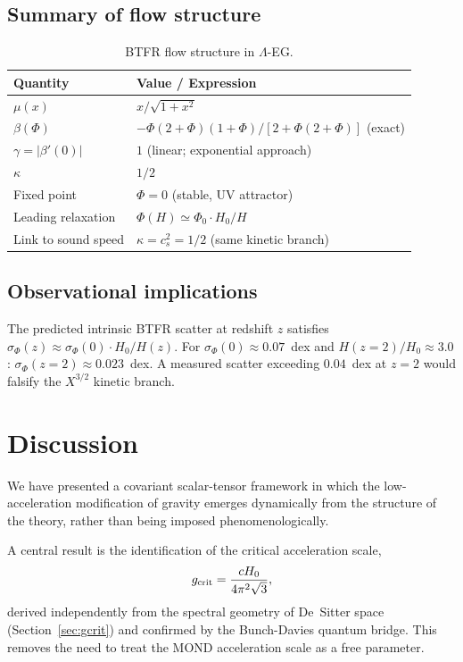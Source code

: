 \documentclass[11pt,a4paper]{article}
\begin{document}
\subsection{Summary of flow structure}

\begin{table}[h]
\centering
\begin{tabular}{ll}
\toprule
Quantity & Value / Expression \\
\midrule
$\mu(x)$ & $x/\sqrt{1+x^2}$ \\
$\beta(\Phi)$ & $-\Phi(2{+}\Phi)(1{+}\Phi)/[2{+}\Phi(2{+}\Phi)]$ (exact) \\
$\gamma = |\beta'(0)|$ & $1$ (linear; exponential approach) \\
$\kappa$ & $1/2$ \\
Fixed point & $\Phi = 0$ (stable, UV attractor) \\
Leading relaxation & $\Phi(H)\simeq \Phi_0\cdot H_0/H$ \\
Link to sound speed & $\kappa = c_s^2 = 1/2$ (same kinetic branch) \\
\bottomrule
\end{tabular}
\caption{BTFR flow structure in $\Lambda$-EG.}
\label{tab:flow}
\end{table}

\subsection{Observational implications}
The predicted intrinsic BTFR scatter at redshift $z$ satisfies
$\sigma_\Phi(z) \approx \sigma_\Phi(0)\cdot H_0/H(z)$.
For $\sigma_\Phi(0)\approx 0.07$~dex and $H(z{=}2)/H_0\approx 3.0$:
$\sigma_\Phi(z{=}2)\approx 0.023$~dex.  A measured scatter exceeding
$0.04$~dex at $z=2$ would falsify the $X^{3/2}$ kinetic branch.

\section{Discussion}
\label{sec:discussion}

We have presented a covariant scalar-tensor framework in which the
low-acceleration modification of gravity emerges dynamically from the
structure of the theory, rather than being imposed phenomenologically.

A central result is the identification of the critical acceleration scale,
\begin{equation}
  g_{\rm crit} = \frac{cH_0}{4\pi^2\sqrt{3}},
\end{equation}
derived independently from the spectral geometry of De~Sitter space
(Section~\ref{sec:gcrit}) and confirmed by the Bunch-Davies quantum bridge.
This removes the need to treat the MOND acceleration scale as a free parameter.
\end{document}
